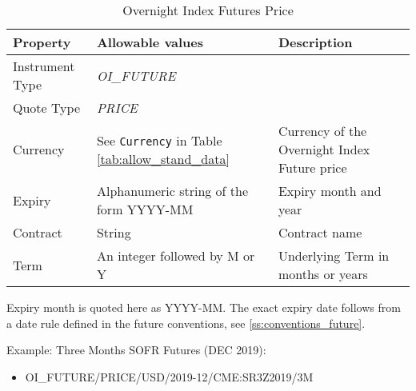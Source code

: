 \begin{table}[H]
\centering
  \begin{tabular}{|p{3cm}|p{4.5cm}|p{7cm}|}
  \hline
    {\bf Property} & {\bf Allowable values} & {\bf Description} \\ \hline
    Instrument Type & \emph{OI\_FUTURE} & \\ \hline
    Quote Type & \emph{PRICE} & \\ \hline
    Currency & See \lstinline!Currency! in Table \ref{tab:allow_stand_data}& Currency of the Overnight Index Future price\\ \hline
    Expiry & Alphanumeric string of the form YYYY-MM & Expiry month and year\\ \hline
    Contract & String & Contract name\\ \hline
    Term & An integer followed by M or Y & Underlying Term in months or years \\ \hline
  \end{tabular}
  \caption{Overnight Index Futures Price}
  \label{tab:oifp_quote}
\end{table}

Expiry month is quoted here as YYYY-MM. The exact expiry date follows from a date rule defined in the future
conventions, see \ref{ss:conventions_future}.

\medskip
Example: Three Months SOFR Futures (DEC 2019):
\begin{itemize}
\item {OI\_FUTURE/PRICE/USD/2019-12/CME:SR3Z2019/3M}
\end{itemize}

